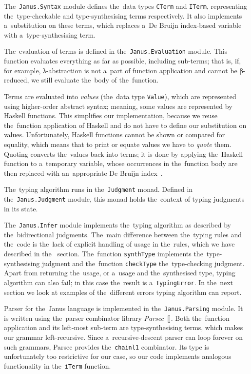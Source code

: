 The~\texttt{Janus.Syntax} module defines the~data types \texttt{CTerm} and
\texttt{ITerm}, representing the~type-checkable and type-synthesising terms
respectively. It also implements a~substitution on these terms, which replaces
a~De Bruijn index-based variable with a~type-synthesising term.

The~evaluation of terms is defined in the~\texttt{Janus.Evaluation} module. This
function evaluates everything as far as possible, including sub-terms; that is,
if, for example, λ-abstraction is not a~part of function application and cannot
be β-reduced, we still evaluate the~body of the~function.

Terms are evaluated into \emph{values} (the~data type \texttt{Value}), which are
represented using higher-order abstract syntax; meaning, some values are
represented by Haskell functions. This simplifies our implementation, because we
reuse the~function application of Haskell and do not have to define our
substitution on values. Unfortunately, Haskell functions cannot be shown or
compared for equality, which means that to print or equate values we have to
\emph{quote} them. Quoting converts the~values back into terms; it is done by
applying the~Haskell function to a~temporary variable, whose occurrences in
the~function body are then replaced with an~appropriate De Bruijn
index~\citep{loh_et_al_2010}.

The~typing algorithm runs in the~\texttt{Judgment} monad. Defined in
the~\texttt{Janus.Judgment} module, this monad holds the~context of typing
judgments in its state.

The~\texttt{Janus.Infer} module implements the~typing algorithm as described by
the~bidirectional judgments. The~main difference between the~typing rules and
the~code is the~lack of explicit handling of usage in the~rules, which we have
described in the~ section. The~function \texttt{synthType}
implements the~type-synthesising judgment and the~function \texttt{checkType}
the~type-checking judgment. Apart from returning the~usage, or a~usage and
the~synthesised type, typing algorithm can also fail; in this case the~result is
a~\texttt{TypingError}. In the~next section we look at examples of the~different
errors typing algorithm can report.

Parser for the~Janus language is implemented in the~\texttt{Janus.Parsing}
module. It is written using the~parser combinator library
\emph{Parsec}~[\citeauthor{parsec}]. Both the~function application and its
left-most sub-term are type-synthesising terms, which makes our grammar
left-recursive. Since a~recursive-descent parser can loop forever on such
grammars, Parsec provides the~\texttt{chainl1} combinator. Its type is
unfortunately too restrictive for our case, so our code implements analogous
functionality in the~\texttt{iTerm} function.

